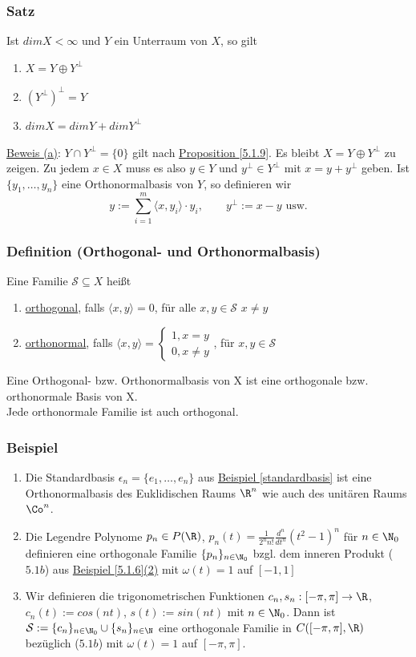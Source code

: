 \subsubsection{Satz}
Ist $dimX<\infty$ und $Y$ ein Unterraum von $X$, so gilt
\alphabet
\begin{enumerate}
\item $X=Y\oplus Y^{\bot}$
\item $(Y^{\bot})^{\bot}=Y$
\item $dimX=dimY+dimY^{\bot}$
\end{enumerate}
\underline{Beweis (a)}: $Y\cap Y^{\bot}=\{0\}$ gilt nach \hyperref[5.1.9]{Proposition \ref*{5.1.9}}. Es bleibt $X=Y\oplus Y^{\bot}$ zu zeigen. Zu jedem $x\in X$ muss es also $y\in Y$ und $y^{\bot}\in Y^{\bot}$ mit $x=y+y^{\bot}$ geben. Ist $\{y_1, \dots,y_n\}$ eine Orthonormalbasis von $Y$, so definieren wir
\[y:=\sum_{i=1}^m \langle x,y_i\rangle \cdot y_i,\qquad y^{\bot}:=x-y\text{ usw.}\]
\subsubsection{Definition (Orthogonal- und Orthonormalbasis)}
Eine Familie $\mathcal{S} \subseteq X$ heißt
\alphabet
\begin{enumerate}
\item \underline{orthogonal}, falls $\langle x,y\rangle=0$, für alle $x,y\in \mathcal{S}$ $x\neq y$
\item \underline{orthonormal}, falls $\langle x,y\rangle=\begin{cases}1,x=y\\0,x\neq y\end{cases}$, für $x,y\in \mathcal{S}$
\end{enumerate}
Eine Orthogonal- bzw. Orthonormalbasis von X ist eine orthogonale bzw. orthonormale Basis von X.\\
Jede orthonormale Familie ist auch orthogonal.
\subsubsection{Beispiel}
\numbers
\begin{enumerate}
\item Die Standardbasis $\epsilon_n=\{e_1,\dots,e_n\}$ aus \hyperref[standardbasis]{Beispiel \ref*{standardbasis}} ist eine Orthonormalbasis des Euklidischen Raums $\R^n$ wie auch des unitären Raums $\Co^n$.
\item Die Legendre Polynome $p_n\in P(\R)$, $p_n(t)=\frac{1}{2^n n!} \frac{d^n}{dt^n} (t^2-1)^n$ für $n\in\N_0$ definieren eine orthogonale Familie $\{p_n\}_{n\in\N_0}$ bzgl. dem inneren Produkt (\hyperref[5.1b]{$5.1b$}) aus \hyperref[5.1.6]{Beispiel \ref{5.1.6}(2)} mit $\omega(t)=1$ auf $[-1,1]$
\item Wir definieren die trigonometrischen Funktionen $c_n,s_n:[-\pi,\pi]\rightarrow\R$, $c_n(t):=cos(nt)$, $s(t):=sin(nt)$ mit $n\in\N_0$. Dann ist $\mathcal{S}:=\{c_n\}_{n\in\N_0} \cup \{s_n\}_{n\in\N}$ eine orthogonale Familie in $C([-\pi,\pi],\R)$ bezüglich (\hyperref[5.1b]{$5.1b$}) mit $\omega(t)=1$ auf $[-\pi,\pi]$.
\end{enumerate}
